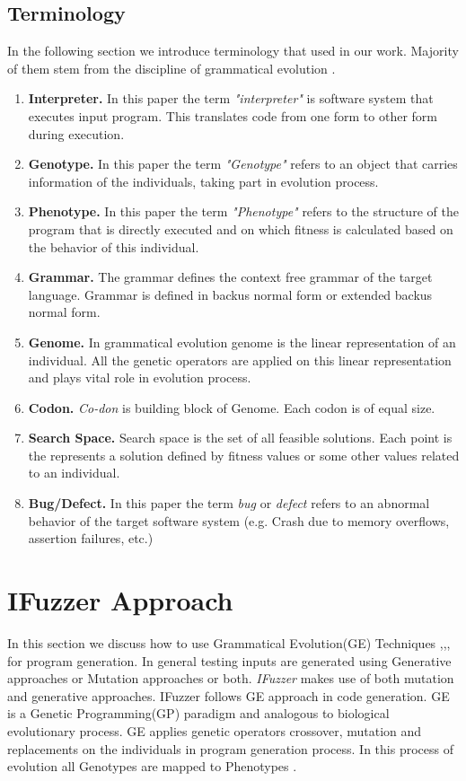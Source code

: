 \documentclass{acm_proc_article-sp}
\begin{document}
\subsection*{Terminology}
In the following section we introduce terminology that used in our work. Majority of them stem from the discipline of grammatical evolution \cite{Ryan01}.
\begin{enumerate}
\item{\textbf{Interpreter.}} In this paper the term \textit{"interpreter"} is software system that executes input program. This translates code from one form to other form during execution. 
\item{\textbf{Genotype.}} In this paper the term \textit{"Genotype"} refers to an  object that carries information of the individuals, taking part in evolution process. 
\item{\textbf{Phenotype.}} In this paper the term \textit{"Phenotype"} refers to the structure of the program that is  directly executed and on which fitness is calculated based on the behavior of this individual.
\item{\textbf{Grammar.}} The grammar defines the context free grammar of the target language. Grammar is defined in backus normal form or extended backus normal form.
\item{\textbf{Genome.}} In grammatical evolution genome is the linear representation of an individual. All the genetic operators are applied on this linear representation and plays vital role in evolution process.
\item{\textbf{Codon.}} \textit{Co-don} is building block of Genome. Each codon is of equal size. 
\item{\textbf{Search Space.}} Search space is the set of all feasible solutions. Each point is the represents a solution defined by fitness values or some other values related to an individual. 
\item{\textbf{Bug/Defect.}} In this paper the term \textit{bug} or \textit{defect} refers to an abnormal behavior of the target software system (e.g. Crash due to memory overflows, assertion failures, etc.) 
\end{enumerate}

\section{IFuzzer Approach} \label{GEIF}
In this section we discuss how to use Grammatical Evolution(GE) Techniques \cite{Ryan98},\cite{Ryan00},\cite{Ryan01},\cite{PoliLM2008} for program generation. In general testing inputs are generated using Generative approaches or Mutation approaches or both. \textit{IFuzzer} makes use of both mutation and generative approaches. IFuzzer follows GE approach in code generation. GE is a Genetic Programming(GP) paradigm and analogous to biological evolutionary process. GE applies genetic operators crossover, mutation and replacements on the individuals in program generation process. In this process of evolution all Genotypes are mapped to Phenotypes \cite{Fagan10}. 
\end{document}
